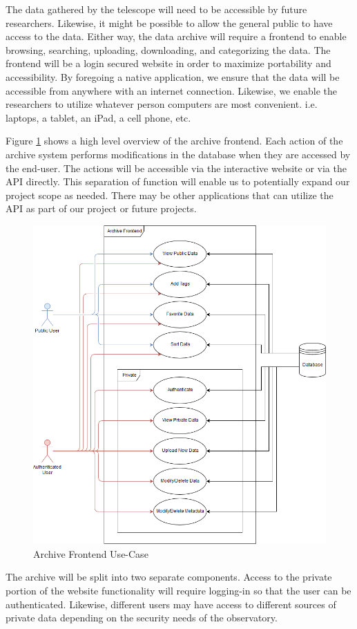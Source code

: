 \documentclass[12pt]{article}
\begin{document}
The data gathered by the telescope will need to be accessible by future researchers. Likewise, it might be possible to allow the general public to have access to the data. Either way, the data archive will require a frontend to enable browsing, searching, uploading, downloading, and categorizing the data. The frontend will be a login secured website in order to maximize portability and accessibility. By foregoing a native application, we ensure that the data will be accessible from anywhere with an internet connection. Likewise, we enable the researchers to utilize whatever person computers are most convenient. i.e. laptops, a tablet, an iPad, a cell phone, etc.

Figure \ref{fig:archiveusecase} shows a high level overview of the archive frontend. Each action of the archive system performs modifications in the database when they are accessed by the end-user. The actions will be accessible via the interactive website or via the API directly. This separation of function will enable us to potentially expand our project scope as needed. There may be other applications that can utilize the API as part of our project or future projects.

\begin{figure}[h]
	\centering
	\includegraphics[width=0.75\linewidth]{frontend_use_case}
	\caption{Archive Frontend Use-Case}
	\label{fig:archiveusecase}
\end{figure}

The archive will be split into two separate components. Access to the private portion of the website functionality will require logging-in so that the user can be authenticated. Likewise, different users may have access to different sources of private data depending on the security needs of the observatory.
\end{document}
